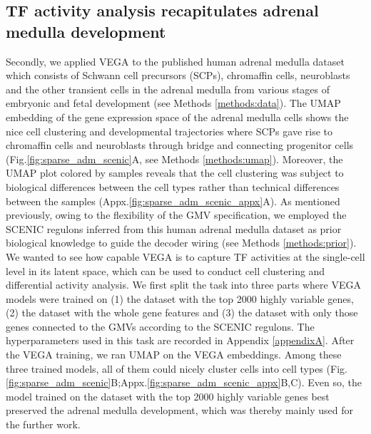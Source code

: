 \subsection{TF activity analysis recapitulates adrenal medulla development}\label{sec:sparse_adm}
Secondly, we applied VEGA\cite{Seninge2021} to the published human adrenal medulla dataset\cite{Jansky2021} which consists of Schwann cell precursors (SCPs), chromaffin cells, neuroblasts and the other transient cells in the adrenal medulla from various stages of embryonic and fetal development (see Methods \ref{methods:data}). The UMAP\cite{McInnes2020} embedding of the gene expression space of the adrenal medulla cells shows the nice cell clustering and developmental trajectories where SCPs gave rise to chromaffin cells and neuroblasts through bridge and connecting progenitor cells\cite{Jansky2021} (Fig.\ref{fig:sparse_adm_scenic}A, see Methods \ref{methods:umap}). Moreover, the UMAP plot colored by samples reveals that the cell clustering was subject to biological differences between the cell types rather than technical differences between the samples (Appx.\ref{fig:sparse_adm_scenic_appx}A). As mentioned previously, owing to the flexibility of the GMV specification, we employed the SCENIC\cite{Aibar2017} regulons inferred from this human adrenal medulla dataset\cite{Jansky2021} as prior biological knowledge to guide the decoder wiring (see Methods \ref{methods:prior}). We wanted to see how capable VEGA is to capture TF activities at the single-cell level in its latent space, which can be used to conduct cell clustering and differential activity analysis. We first split the task into three parts where VEGA models were trained on (1) the dataset with the top 2000 highly variable genes, (2) the dataset with the whole gene features and (3) the dataset with only those genes connected to the GMVs according to the SCENIC regulons. The hyperparameters used in this task are recorded in Appendix \ref{appendixA}. After the VEGA training, we ran UMAP on the VEGA embeddings. Among these three trained models, all of them could nicely cluster cells into cell types (Fig.\ref{fig:sparse_adm_scenic}B;Appx.\ref{fig:sparse_adm_scenic_appx}B,C). Even so, the model trained on the dataset with the top 2000 highly variable genes best preserved the adrenal medulla development, which was thereby mainly used for the further work.

